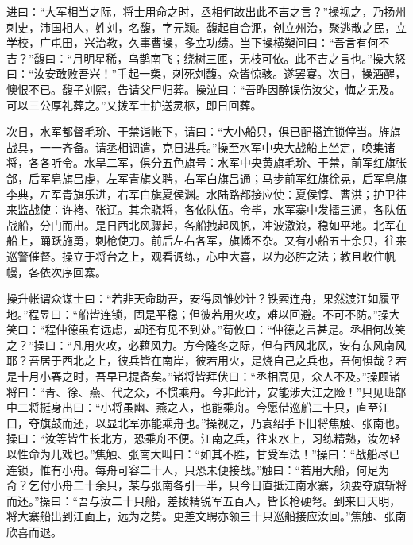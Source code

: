 进曰：“大军相当之际，将士用命之时，丞相何故出此不吉之言？”操视之，乃扬州刺史，沛国相人，姓刘，名馥，字元颖。馥起自合淝，创立州治，聚逃散之民，立学校，广屯田，兴治教，久事曹操，多立功绩。当下操横槊问曰：“吾言有何不吉？”馥曰：“月明星稀，乌鹊南飞；绕树三匝，无枝可依。此不吉之言也。”操大怒曰：“汝安敢败吾兴！”手起一槊，刺死刘馥。众皆惊骇。遂罢宴。次日，操酒醒，懊恨不已。馥子刘熙，告请父尸归葬。操泣曰：“吾昨因醉误伤汝父，悔之无及。可以三公厚礼葬之。”又拨军士护送灵柩，即日回葬。

次日，水军都督毛玠、于禁诣帐下，请曰：“大小船只，俱已配搭连锁停当。旌旗战具，一一齐备。请丞相调遣，克日进兵。”操至水军中央大战船上坐定，唤集诸将，各各听令。水旱二军，俱分五色旗号：水军中央黄旗毛玠、于禁，前军红旗张郃，后军皂旗吕虔，左军青旗文聘，右军白旗吕通；马步前军红旗徐晃，后军皂旗李典，左军青旗乐进，右军白旗夏侯渊。水陆路都接应使：夏侯惇、曹洪；护卫往来监战使：许褚、张辽。其余骁将，各依队伍。令毕，水军寨中发擂三通，各队伍战船，分门而出。是日西北风骤起，各船拽起风帆，冲波激浪，稳如平地。北军在船上，踊跃施勇，刺枪使刀。前后左右各军，旗幡不杂。又有小船五十余只，往来巡警催督。操立于将台之上，观看调练，心中大喜，以为必胜之法；教且收住帆幔，各依次序回寨。

操升帐谓众谋士曰：“若非天命助吾，安得凤雏妙计？铁索连舟，果然渡江如履平地。”程昱曰：“船皆连锁，固是平稳；但彼若用火攻，难以回避。不可不防。”操大笑曰：“程仲德虽有远虑，却还有见不到处。”荀攸曰：“仲德之言甚是。丞相何故笑之？”操曰：“凡用火攻，必藉风力。方今隆冬之际，但有西风北风，安有东风南风耶？吾居于西北之上，彼兵皆在南岸，彼若用火，是烧自己之兵也，吾何惧哉？若是十月小春之时，吾早已提备矣。”诸将皆拜伏曰：“丞相高见，众人不及。”操顾诸将曰：“青、徐、燕、代之众，不惯乘舟。今非此计，安能涉大江之险！”只见班部中二将挺身出曰：“小将虽幽、燕之人，也能乘舟。今愿借巡船二十只，直至江口，夺旗鼓而还，以显北军亦能乘舟也。”操视之，乃袁绍手下旧将焦触、张南也。操曰：“汝等皆生长北方，恐乘舟不便。江南之兵，往来水上，习练精熟，汝勿轻以性命为儿戏也。”焦触、张南大叫曰：“如其不胜，甘受军法！”操曰：“战船尽已连锁，惟有小舟。每舟可容二十人，只恐未便接战。”触曰：“若用大船，何足为奇？乞付小舟二十余只，某与张南各引一半，只今日直抵江南水寨，须要夺旗斩将而还。”操曰：“吾与汝二十只船，差拨精锐军五百人，皆长枪硬弩。到来日天明，将大寨船出到江面上，远为之势。更差文聘亦领三十只巡船接应汝回。”焦触、张南欣喜而退。

